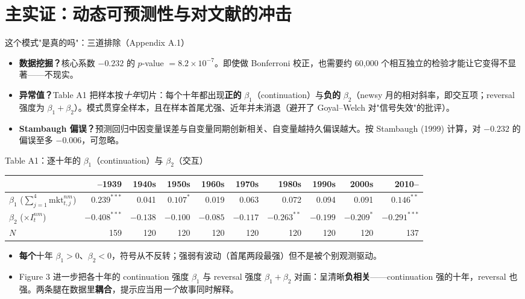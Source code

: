 \documentclass[aspectratio=169,10pt]{beamer}
\newcommand{\tinytab}{\tiny\setlength{\tabcolsep}{2.2pt}\renewcommand{\arraystretch}{1.08}}
\newcommand{\flag}{\ensuremath{\textstyle\sum_{j=1}^{4}\mathrm{mkt}^{nm}_{t,j}}}
\begin{document}
\section{主实证：动态可预测性与对文献的冲击}

\begin{frame}{这个模式"是真的吗"：三道排除（Appendix A.1）}
	\begin{itemize}
		\item \textbf{数据挖掘？}核心系数 $-0.232$ 的 $p$-value $=8.2\times10^{-7}$。即使做 Bonferroni 校正，也需要约 \alert{60{,}000} 个相互独立的检验才能让它变得不显著——不现实。
		\item \textbf{异常值？}Table A1 把样本按\emph{十年}切片：每个十年都出现\textbf{正的} $\beta_1$（continuation）与\textbf{负的} $\beta_2$（newsy 月的相对斜率，即交互项；reversal 强度为 $\beta_1+\beta_2$）。模式贯穿全样本，且在样本首尾尤强、近年并未消退（避开了 Goyal--Welch 对"信号失效"的批评）。
		\item \textbf{Stambaugh 偏误？}预测回归中因变量误差与自变量同期创新相关、自变量越持久偏误越大。按 Stambaugh (1999) 计算，对 $-0.232$ 的偏误至多 $-0.006$，可忽略。
	\end{itemize}
\end{frame}

\begin{frame}{Table A1：逐十年的 $\beta_1$（continuation）与 $\beta_2$（交互）}
	\tinytab
	\begin{tabular}{lrrrrrrrrr}
		\toprule
		& --1939 & 1940s & 1950s & 1960s & 1970s & 1980s & 1990s & 2000s & 2010-- \\
		\midrule
		$\beta_1$ ($\flag$) & $0.239^{***}$ & 0.041 & $0.107^{*}$ & 0.019 & 0.063 & 0.072 & 0.094 & 0.091 & $0.146^{**}$ \\
		$\beta_2$ ($\times I^{nm}_t$) & $-0.408^{***}$ & $-0.138$ & $-0.100$ & $-0.085$ & $-0.117$ & $-0.263^{**}$ & $-0.199$ & $-0.209^{*}$ & $-0.291^{***}$ \\
		$N$ & 159 & 120 & 120 & 120 & 120 & 120 & 120 & 120 & 137 \\
		\bottomrule
	\end{tabular}
	\vspace{5pt}
	\begin{itemize}
		\item \textbf{每个}十年 $\beta_1>0$、$\beta_2<0$，符号从不反转；强弱有波动（首尾两段最强）但不是被个别观测驱动。
		\item Figure 3 进一步把各十年的 continuation 强度 $\beta_1$ 与 reversal 强度 $\beta_1+\beta_2$ 对画：呈清晰\textbf{负相关}——continuation 强的十年，reversal 也强。两条腿在数据里\textbf{耦合}，提示应当用\emph{一个}故事同时解释。
	\end{itemize}
\end{frame}
\end{document}
